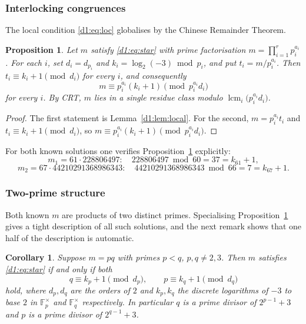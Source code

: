 \documentclass[a4paper]{article}
\theoremstyle{plain}
\newtheorem{proposition}{Proposition}[subsection]
\newtheorem{corollary}{Corollary}[subsection]
\theoremstyle{definition}
\theoremstyle{remark}
\newcommand{\F}{\mathbb{F}}
\DeclareMathOperator{\lcm}{lcm}
\begin{document}
\subsubsection{Interlocking congruences}\label{d1:sec:interlock}

The local condition \eqref{d1:eq:loc} globalises by the Chinese Remainder Theorem.

\begin{proposition}\label{d1:prop:crt}
Let $m$ satisfy \eqref{d1:eq:star} with prime factorisation $m=\prod_{i=1}^{r}p_{i}^{a_{i}}$. For
each $i$, set $d_{i}=d_{p_{i}}$ and $k_{i}=\log_{2}(-3)\bmod p_{i}$, and put $t_{i}=m/p_{i}^{a_{i}}$.
Then $t_{i}\equiv k_{i}+1\pmod{d_{i}}$ for every $i$, and consequently
\[
m\equiv p_{i}^{a_{i}}(k_{i}+1)\pmod{p_{i}^{a_{i}}d_{i}}
\]
for every $i$. By CRT, $m$ lies in a single residue class modulo
$\lcm_{i}\!\big(p_{i}^{a_{i}}d_{i}\big)$.
\end{proposition}

\begin{proof}
The first statement is Lemma~\ref{d1:lem:local}. For the second, $m=p_{i}^{a_{i}}t_{i}$ and
$t_{i}\equiv k_{i}+1\pmod{d_{i}}$, so $m\equiv p_{i}^{a_{i}}(k_{i}+1)\pmod{p_{i}^{a_{i}}d_{i}}$.
\end{proof}

For both known solutions one verifies Proposition~\ref{d1:prop:crt} explicitly:
\[
m_{1}=61\cdot 228806497:\quad 228806497 \bmod 60 = 37 = k_{61}+1,
\]
\[
m_{2}=67\cdot 44210291368986343:\quad 44210291368986343 \bmod 66 = 7 = k_{67}+1.
\]

\subsubsection{Two-prime structure}\label{d1:sec:twoprime}

Both known $m$ are products of two distinct primes. Specialising Proposition~\ref{d1:prop:crt}
gives a tight description of all such solutions, and the next remark shows that one half of the
description is automatic.

\begin{corollary}\label{d1:cor:twoprime}
Suppose $m=pq$ with primes $p<q$, $p,q\ne 2,3$. Then $m$ satisfies \eqref{d1:eq:star} if and only
if both
\begin{equation}\label{d1:eq:pair}
q\equiv k_{p}+1\pmod{d_{p}},\qquad p\equiv k_{q}+1\pmod{d_{q}}
\end{equation}
hold, where $d_{p},d_{q}$ are the orders of $2$ and $k_{p},k_{q}$ the discrete logarithms of
$-3$ to base $2$ in $\F_{p}^{\times}$ and $\F_{q}^{\times}$ respectively. In particular $q$ is a
prime divisor of $2^{p-1}+3$ and $p$ is a prime divisor of $2^{q-1}+3$.
\end{corollary}
\end{document}
